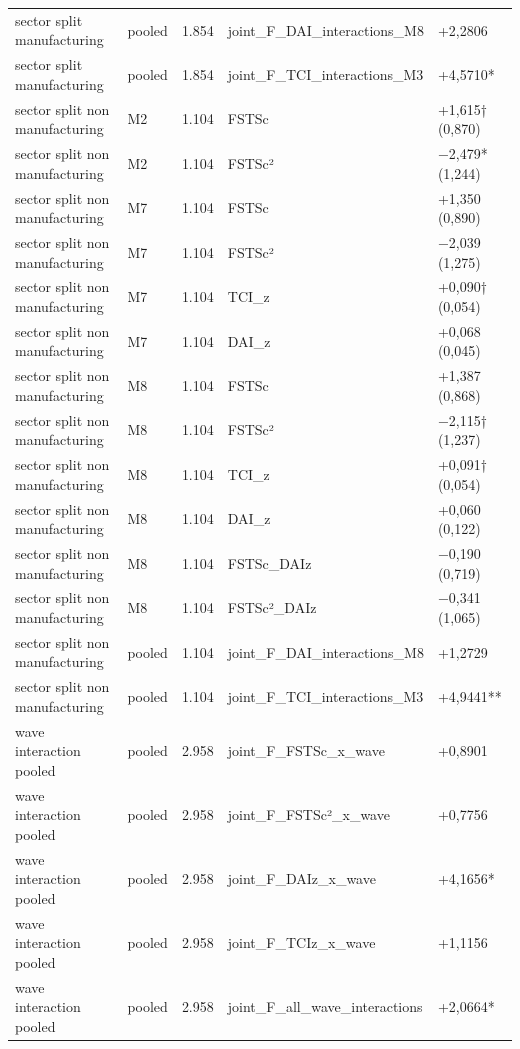 \documentclass[12pt,a4paper]{article}
\begin{document}
\begin{longtable}[]{@{}lllll@{}}
sector split manufacturing & pooled & 1.854 &
joint\_F\_DAI\_interactions\_M8 & +2,2806 \\
sector split manufacturing & pooled & 1.854 &
joint\_F\_TCI\_interactions\_M3 & +4,5710* \\
sector split non manufacturing & M2 & 1.104 & FSTSc & +1,615† (0,870) \\
sector split non manufacturing & M2 & 1.104 & FSTSc² & −2,479*
(1,244) \\
sector split non manufacturing & M7 & 1.104 & FSTSc & +1,350 (0,890) \\
sector split non manufacturing & M7 & 1.104 & FSTSc² & −2,039 (1,275) \\
sector split non manufacturing & M7 & 1.104 & TCI\_z & +0,090†
(0,054) \\
sector split non manufacturing & M7 & 1.104 & DAI\_z & +0,068 (0,045) \\
sector split non manufacturing & M8 & 1.104 & FSTSc & +1,387 (0,868) \\
sector split non manufacturing & M8 & 1.104 & FSTSc² & −2,115†
(1,237) \\
sector split non manufacturing & M8 & 1.104 & TCI\_z & +0,091†
(0,054) \\
sector split non manufacturing & M8 & 1.104 & DAI\_z & +0,060 (0,122) \\
sector split non manufacturing & M8 & 1.104 & FSTSc\_DAIz & −0,190
(0,719) \\
sector split non manufacturing & M8 & 1.104 & FSTSc²\_DAIz & −0,341
(1,065) \\
sector split non manufacturing & pooled & 1.104 &
joint\_F\_DAI\_interactions\_M8 & +1,2729 \\
sector split non manufacturing & pooled & 1.104 &
joint\_F\_TCI\_interactions\_M3 & +4,9441** \\
wave interaction pooled & pooled & 2.958 & joint\_F\_FSTSc\_x\_wave &
+0,8901 \\
wave interaction pooled & pooled & 2.958 & joint\_F\_FSTSc²\_x\_wave &
+0,7756 \\
wave interaction pooled & pooled & 2.958 & joint\_F\_DAIz\_x\_wave &
+4,1656* \\
wave interaction pooled & pooled & 2.958 & joint\_F\_TCIz\_x\_wave &
+1,1156 \\
wave interaction pooled & pooled & 2.958 &
joint\_F\_all\_wave\_interactions & +2,0664* \\
\end{longtable}
\end{document}
